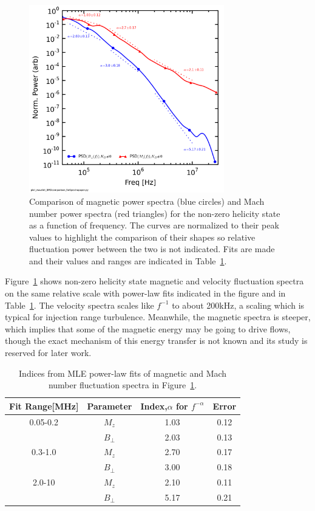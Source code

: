 \documentclass[aip,prl,amsmath,amssymb,reprint,superscriptaddress]{revtex4-1} %
\begin{document}
\begin{figure}[!htbp]
\centerline{
\includegraphics[width=8.5cm]{BvsFlowspec_wFits_40t60us}}
\caption{\label{fig:BvsFlow_wFits} Comparison of magnetic power spectra (blue circles) and Mach number power spectra (red triangles) for the non-zero helicity state as a function of frequency. The curves are normalized to their peak values to highlight the comparison of their shapes so relative fluctuation power between the two is not indicated. Fits are made and their values and ranges are indicated in Table~\ref{tab:BMindices}.}
\end{figure}

Figure~\ref{fig:BvsFlow_wFits} shows non-zero helicity state magnetic and velocity fluctuation spectra on the same relative scale with power-law fits indicated in the figure and in Table~\ref{tab:BMindices}. The velocity spectra scales like $f^{-1}$ to about 200kHz, a scaling which is typical for injection range turbulence. Meanwhile, the magnetic spectra is steeper, which implies that some of the magnetic energy may be going to drive flows, though the exact mechanism of this energy transfer is not known and its study is reserved for later work.

\begin{table}
\caption{\label{tab:BMindices}Indices from MLE power-law fits of magnetic and Mach number fluctuation spectra in Figure~\ref{fig:BvsFlow_wFits}.}
\begin{tabular}{cccc}
\toprule
Fit Range[MHz]	&	Parameter		&	Index,$\alpha$ for $f^{-\alpha}$	&Error\\
\hline
0.05-0.2				& $M_{z}$			& 1.03	&0.12\\
								& $B_{\perp}$	& 2.03  &0.13\\
\hline
0.3-1.0					& $M_{z}$			& 2.70	&0.17\\
								& $B_{\perp}$	& 3.00  &0.18\\
\hline
2.0-10					& $M_{z}$			& 2.10	&0.11\\
								& $B_{\perp}$	& 5.17  &0.21\\
\hline
\end{tabular}
\end{table}
\end{document}
